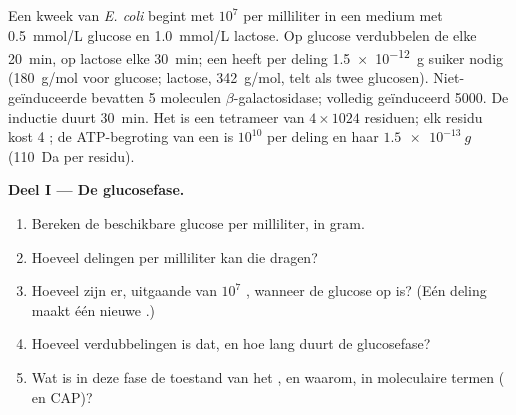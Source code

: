 \begin{problem}
\label{pb:b1:expression-control:1}
Een kweek van \emph{E. coli} begint met $10^7$  per milliliter in een medium
met \qty{0.5}{mmol/L} glucose en \qty{1.0}{mmol/L} lactose. Op glucose verdubbelen
de  elke \qty{20}{min}, op lactose elke \qty{30}{min}; een  heeft per
deling \qty{1.5e-12}{g} suiker nodig (\qty{180}{g/mol} voor glucose; lactose,
\qty{342}{g/mol}, telt als twee glucosen). Niet-geïnduceerde  bevatten 5
moleculen $\beta$-galactosidase; volledig geïnduceerd \num{5000}. De inductie duurt
\qty{30}{min}. Het  is een tetrameer van $4\times 1024$ residuen; elk residu
kost 4 ; de ATP-begroting van een  is $10^{10}$ per deling en haar 
$\qty{1.5e-13}{g}$ (\qty{110}{Da} per residu).

\medskip
\noindent\textbf{Deel I --- De glucosefase.}
\begin{enumerate}
  \item Bereken de beschikbare glucose per milliliter, in gram.
  \item Hoeveel delingen per milliliter kan die dragen?
  \item Hoeveel  zijn er, uitgaande van $10^7$ , wanneer de
        glucose op is? (Eén deling maakt één nieuwe .)
  \item Hoeveel verdubbelingen is dat, en hoe lang duurt de glucosefase?
  \item Wat is in deze fase de toestand van het , en waarom, in
        moleculaire termen ( en CAP)?
\end{enumerate}


\end{problem}
